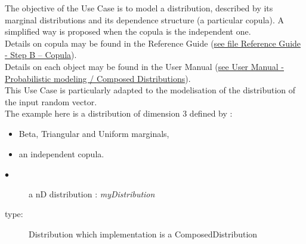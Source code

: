 \renewcommand{\filename}{docUC_InputNoData_ComposedDistribution.tex}
\renewcommand{\filetitle}{UC : Creation  of nD distribution from (marginals, copula)}

\HeaderIIILevel







The objective of the Use Case is to model a distribution, described by its marginal distributions and its dependence structure (a particular copula). A simplified way is proposed when the copula is the independent one.\\

Details on copula may be found in the Reference Guide (\href{OpenTURNS_ReferenceGuide.pdf}{see file Reference Guide - Step B -- Copula}).\\

Details on each object may be found in the User Manual  (\href{OpenTURNS_UserManual_TUI.pdf}{see User Manual - Probabilistic modeling / Composed Distributions}).\\

This Use Case is particularly adapted to the modelisation of the distribution of the input random vector.\\

The example here is a distribution of dimension 3 defined by :
\begin{itemize}
\item Beta, Triangular and Uniform marginals,
\item an independent copula.
\end{itemize}

\noindent%
{
  \begin{description}
  \item[$\bullet$] a nD distribution : {\itshape myDistribution}
  \item[type:] Distribution which implementation is a ComposedDistribution
  \end{description}
}

